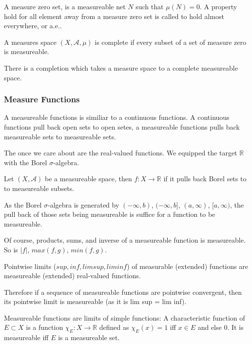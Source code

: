 \documentclass[main.tex]{subfiles}
\begin{document}
A measure zero set, is a measureable net $N$ such that $\mu(N) = 0$. A property hold for all element away from a measure zero set is called to hold almost everywhere, or a.e..

\begin{definition}
A measures space $(X, \mathcal{A}, \mu)$ is complete if every subset of a set of measure zero is measureable.
\end{definition}

There is a completion which takes a measure space to a complete measureable space.

\subsubsection{Measure Functions}
A measureable functions is similiar to a continuous functions. A continuous functions pull back open sets to open setes, a measureable functions pulls back measureable sets to measureable sets.


The once we care about are the real-valued functions. We equipped the target $\mathbb{R}$ with the Borel $\sigma$-algebra. 

\begin{definition}
Let $(X, \mathcal{A})$ be a measureable space, then $f : X \rightarrow \mathbb{R}$ if it pulls back Borel sets to to measureable subsets.
\end{definition}

As the Borel $\sigma$-algebra is generated by $(-\infty, b)$, $(-\infty, b]$, $(a, \infty)$, $[a, \infty)$, the pull back of those sets being measureable is suffice for a function to be measureable.

Of course, products, sums, and inverse of a measureable function is measureable. So is $|f|$, $max(f,g)$, $min(f, g)$.




\begin{lemma}

Pointwise limits ($sup, inf, lim sup, lim inf$) of measurable (extended) functions are measureable (extended) real-valued functions. 
\end{lemma}

Therefore if a sequence of measureable functions are pointwise convergent, then its pointwise limit is measureable (as it is lim sup = lim inf).

Measureable functions are limits of simple functions:
A characteristic function of $E \subset X$ is a function $\chi_E: X \rightarrow \mathbb{R}$ defined as $\chi_E(x) = 1$ iff $x \in E$ and else $0$. It is measureable iff $E$ is a measureable set.
\end{document}
